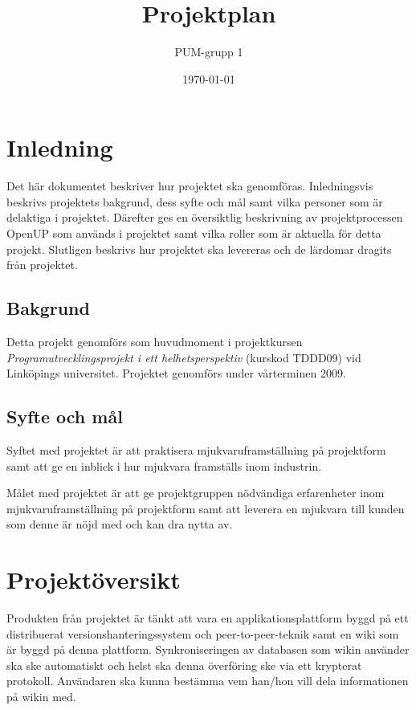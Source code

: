 

\ifpdf
\else
\fi

\title{Projektplan}
\author{PUM-grupp 1}
\date{\today}



\maketitle\thispagestyle{empty}

\newpage

\section{Inledning}
Det här dokumentet beskriver hur projektet ska genomföras. Inledningsvis beskrivs projektets bakgrund, dess syfte och mål samt vilka personer som är delaktiga i projektet. Därefter ges en översiktlig beskrivning av projektprocessen OpenUP som används i projektet samt vilka roller som är aktuella för detta projekt. Slutligen beskrivs hur projektet ska levereras och de lärdomar dragits från projektet.

\subsection{Bakgrund}
Detta projekt genomförs som huvudmoment i projektkursen \textit{Programutvecklingsprojekt i ett helhetsperspektiv} (kurskod TDDD09) vid Linköpings universitet. Projektet genomförs under vårterminen 2009.

\subsection{Syfte och mål}
Syftet med projektet är att praktisera mjukvaruframställning på projektform samt att ge en inblick i hur mjukvara framställs inom industrin.

Målet med projektet är att ge projektgruppen nödvändiga erfarenheter inom mjukvaruframställning på projektform samt att leverera en mjukvara till kunden som denne är nöjd med och kan dra nytta av.

\section{Projektöversikt}
Produkten från projektet är tänkt att vara en applikationsplattform byggd på ett distribuerat versionshanteringssystem och peer-to-peer-teknik samt en wiki som är byggd på denna plattform. Synkroniseringen av databasen som wikin använder ska ske automatiskt och helst ska denna överföring ske via ett krypterat protokoll. Användaren ska kunna bestämma vem han/hon vill dela informationen på wikin med.

